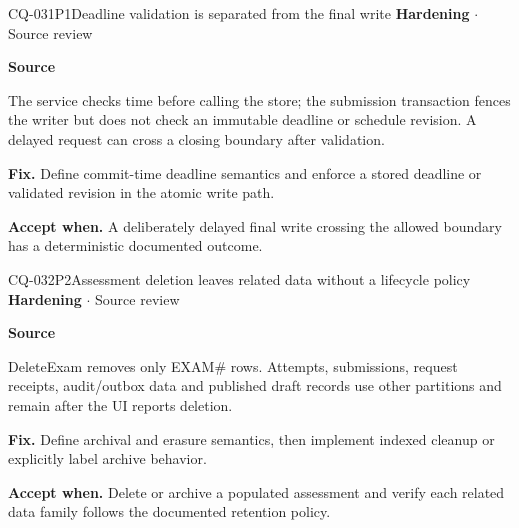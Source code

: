 \begin{finding}{CQ-031}{P1}{Deadline validation is separated from the final write}
\textbf{Hardening} $\cdot$ Source review\par
\textbf{Source}\quad{}\par
The service checks time before calling the store; the submission transaction fences the writer but does not check an immutable deadline or schedule revision. A delayed request can cross a closing boundary after validation.\par
\textbf{Fix.} Define commit-time deadline semantics and enforce a stored deadline or validated revision in the atomic write path.\par
\textbf{Accept when.} A deliberately delayed final write crossing the allowed boundary has a deterministic documented outcome.
\end{finding}
\begin{finding}{CQ-032}{P2}{Assessment deletion leaves related data without a lifecycle policy}
\textbf{Hardening} $\cdot$ Source review\par
\textbf{Source}\quad{}\par
DeleteExam removes only EXAM\# rows. Attempts, submissions, request receipts, audit/outbox data and published draft records use other partitions and remain after the UI reports deletion.\par
\textbf{Fix.} Define archival and erasure semantics, then implement indexed cleanup or explicitly label archive behavior.\par
\textbf{Accept when.} Delete or archive a populated assessment and verify each related data family follows the documented retention policy.
\end{finding}
\clearpage

